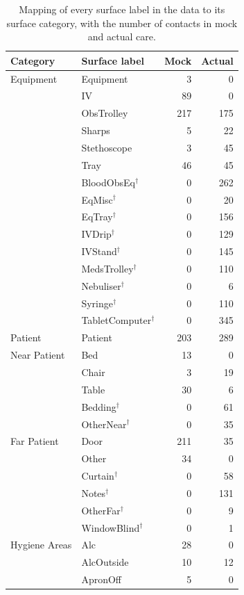 \begin{table}[htbp]
\centering
\footnotesize
\caption{Mapping of every surface label in the data to its surface category, with the number of contacts in mock and actual care.}
\label{tab:s2_mapping}
\begin{tabular*}{\linewidth}{@{\extracolsep{\fill}}llrr}
\toprule
\textbf{Category} & \textbf{Surface label} & \textbf{Mock} & \textbf{Actual} \\
\midrule
Equipment & Equipment & 3 & 0 \\
 & IV & 89 & 0 \\
 & ObsTrolley & 217 & 175 \\
 & Sharps & 5 & 22 \\
 & Stethoscope & 3 & 45 \\
 & Tray & 46 & 45 \\
 & BloodObsEq$^\dagger$ & 0 & 262 \\
 & EqMisc$^\dagger$ & 0 & 20 \\
 & EqTray$^\dagger$ & 0 & 156 \\
 & IVDrip$^\dagger$ & 0 & 129 \\
 & IVStand$^\dagger$ & 0 & 145 \\
 & MedsTrolley$^\dagger$ & 0 & 110 \\
 & Nebuliser$^\dagger$ & 0 & 6 \\
 & Syringe$^\dagger$ & 0 & 110 \\
 & TabletComputer$^\dagger$ & 0 & 345 \\
\addlinespace
Patient & Patient & 203 & 289 \\
\addlinespace
Near Patient & Bed & 13 & 0 \\
 & Chair & 3 & 19 \\
 & Table & 30 & 6 \\
 & Bedding$^\dagger$ & 0 & 61 \\
 & OtherNear$^\dagger$ & 0 & 35 \\
\addlinespace
Far Patient & Door & 211 & 35 \\
 & Other & 34 & 0 \\
 & Curtain$^\dagger$ & 0 & 58 \\
 & Notes$^\dagger$ & 0 & 131 \\
 & OtherFar$^\dagger$ & 0 & 9 \\
 & WindowBlind$^\dagger$ & 0 & 1 \\
\addlinespace
Hygiene Areas & Alc & 28 & 0 \\
 & AlcOutside & 10 & 12 \\
 & ApronOff & 5 & 0 \\

\end{tabular*}
\end{table}
